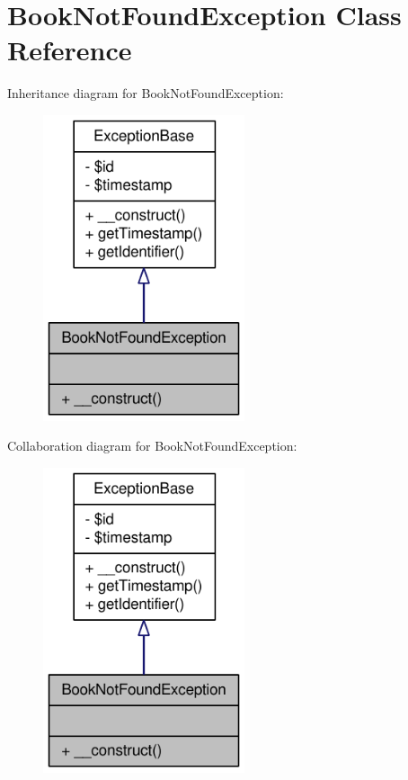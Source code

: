 \hypertarget{classBookNotFoundException}{
\section{BookNotFoundException Class Reference}
\label{classBookNotFoundException}
}


Inheritance diagram for BookNotFoundException:\nopagebreak
\begin{figure}[H]
\begin{center}
\leavevmode
\includegraphics[width=168pt]{classBookNotFoundException__inherit__graph}
\end{center}
\end{figure}


Collaboration diagram for BookNotFoundException:\nopagebreak
\begin{figure}[H]
\begin{center}
\leavevmode
\includegraphics[width=168pt]{classBookNotFoundException__coll__graph}
\end{center}
\end{figure}
